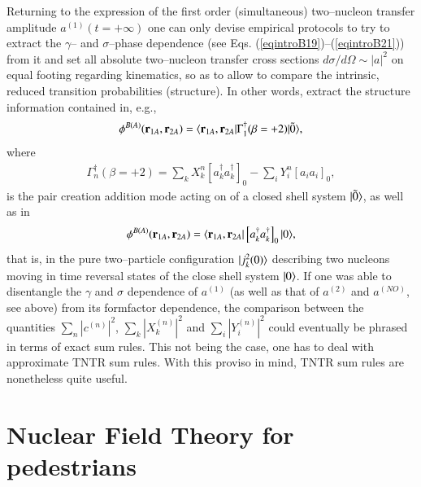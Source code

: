 Returning to the expression of the first order (simultaneous) two--nucleon transfer amplitude $a^{(1)}(t=+\infty)$ one can only devise empirical protocols to try to extract the $\gamma$-- and $\sigma$--phase dependence (see Eqs. (\ref{eqintroB19})--(\ref{eqintroB21})) from it and set all absolute two--nucleon transfer cross sections $d\sigma/d\Omega\sim |a|^2$ on equal footing regarding kinematics, so as to allow to compare the intrinsic, reduced transition probabilities (structure). In other words, extract the structure information contained in, e.g.,
 \begin{align}
\phi^{B(A)}(\mathbf r_{1A},\mathbf r_{2A})=\langle {\mathbf r_{1A},\mathbf r_{2A}|\Gamma^\dagger_1(\beta=+2)|\tilde 0} \rangle,
 \end{align}
where
 \begin{align}
\Gamma_n^\dagger(\beta=+2)=\sum_k X_k^n\left[a^\dagger_ka^\dagger_k\right]_0-\sum_i Y^n_i \left[a_i a_i\right]_0,
 \end{align}
is the pair creation addition mode acting on of a closed shell system $|{\tilde 0} \rangle$, as well as in
 \begin{align}
\phi^{B(A)}(\mathbf r_{1A},\mathbf r_{2A})=\langle {\mathbf r_{1A},\mathbf r_{2A}}|\left[a^\dagger_ka^\dagger_k\right]_0|{0} \rangle,
 \end{align}
that is, in the pure two--particle configuration $|{j^2_k(0)} \rangle$ describing two nucleons moving in time reversal states of the close shell system $|{0} \rangle$. If one was able to disentangle the $\gamma$ and $\sigma$ dependence of $a^{(1)}$ (as well as that of $a^{(2)}$ and $a^{(NO)}$, see above) from its formfactor dependence, the comparison between the quantities $\sum_n|c^{(n)}|^2$, $\sum_k|X^{(n)}_k|^2$ and $\sum_i|Y^{(n)}_i|^2$ could  eventually be phrased in terms of exact sum rules. This not being  the case, one has to  deal with approximate TNTR sum rules. With this proviso in mind, TNTR sum rules are nonetheless quite useful.
\section{Nuclear Field Theory for pedestrians}\label{appintroA}


